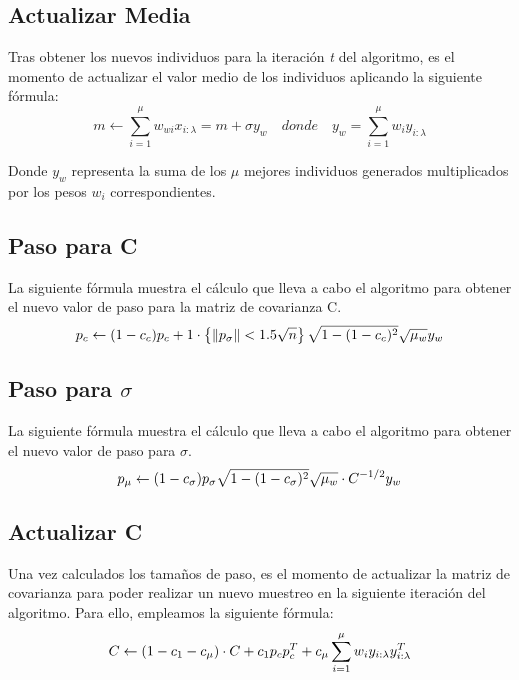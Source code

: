 \subsection{Actualizar Media}
Tras obtener los nuevos individuos para la iteración \textit{t} del algoritmo, es el momento de actualizar el valor medio de los individuos aplicando la siguiente fórmula: 
\begin{equation} \label{eq:2}
    m \leftarrow \sum_{i=1}^{\mu} w_{wi}x_{i:\lambda} = m + \sigma y_{w}\quad donde\quad y_{w} = \sum_{i=1}^{\mu} w_{i}y_{i:\lambda} 
\end{equation}

Donde $y_{w}$ representa la suma de los $\mu$ mejores individuos generados multiplicados por los pesos $w_{i}$ correspondientes.

\subsection{Paso para C}
La siguiente fórmula muestra el cálculo que lleva a cabo el algoritmo para obtener el nuevo valor de paso para la matriz de covarianza C.
\begin{equation} \label{eq:3}
   p_{c} \leftarrow (1 - c_{c})p_{c} + 1\cdot\left \{ \left \|p_{\sigma}\right \|< 1.5 \sqrt{n} \right \} \sqrt{1 - (1 - c_{c})^2}\sqrt{\mu_{w}}y_{w} \\
\end{equation}


\subsection{Paso para $ \sigma $}
La siguiente fórmula muestra el cálculo que lleva a cabo el algoritmo para obtener el nuevo valor de paso para $\sigma$.
\begin{equation} \label{eq:4}
     p_{\mu} \leftarrow (1 - c_{\sigma})p_{\sigma}\sqrt{1 - (1 - c_{\sigma})^2}\sqrt{\mu_{w}}\cdot C^{-1/2}y_{w} \\
\end{equation}

\subsection{Actualizar C}
Una vez calculados los tamaños de paso, es el momento de actualizar la matriz de covarianza para poder realizar un nuevo muestreo en la siguiente iteración del algoritmo. Para ello, empleamos la siguiente fórmula:
\begin{equation} \label{eq:5}
    C \leftarrow (1 - c_{1} - c_{\mu})\cdot C + c_{1}p_{c}p_{c}^{T} + c_{\mu} \sum_{i=1}^{\mu} w_{i}y_{i:\lambda}y_{i:\lambda}^{T} \\
\end{equation}

